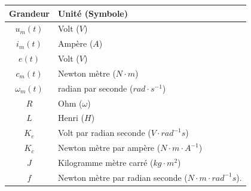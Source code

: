{\begin{center}
\begin{tabularx}{.7\linewidth}{|c|X|}
\hline
Grandeur & Unité (Symbole)\\
\hline
$u_m(t)$ & Volt ($V$)\\
\hline
$i_m(t)$ & Ampère ($A$)\\
\hline
$e(t)$ & Volt ($V$)\\
\hline
$c_m(t)$ & Newton mètre ($N\cdot m$)\\
\hline
$\omega_m(t)$ & radian par seconde ($rad\cdot s^{-1}$)\\
\hline
$R$ & Ohm ($\omega$)\\
\hline
$L$ & Henri ($H$)\\
\hline
$K_e$ & Volt par radian seconde ($V\cdot rad^{-1} s$) \\
\hline
$K_c$ & Newton mètre par ampère ($N\cdot m \cdot A^{-1}$) \\
\hline
$J$ & Kilogramme mètre carré ($kg\cdot m^2$)\\
\hline
$f$ & Newton mètre par radian seconde ($N\cdot m\cdot rad^{-1} s$).\\
\hline
\end{tabularx}
\end{center}}


